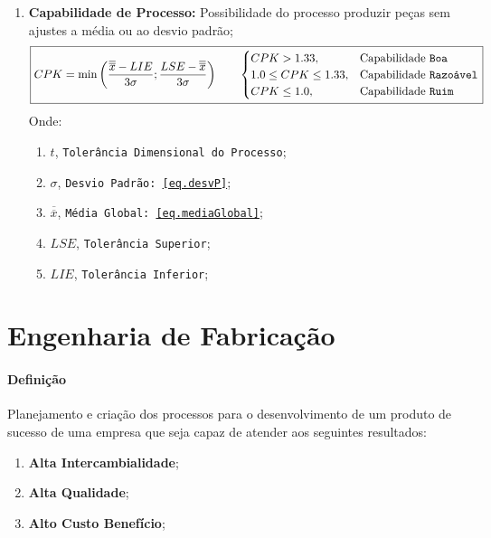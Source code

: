 \documentclass{article}
\begin{document}
\begin{enumerate}[rightmargin = \leftmargin, noitemsep]
                    \item \textbf{Capabilidade de Processo:} Possibilidade do processo produzir peças sem ajustes a média ou ao desvio padrão;
                        \begin{equation}
                            \boxed{
                                CPK = \min\left( \frac{\overline{\overline{x}} - LIE}{3\sigma}; \frac{LSE - \overline{\overline{x}}}{3\sigma} \right)
                                \qquad
                                \begin{cases}
                                    CPK > 1.33, & \text{Capabilidade \texttt{Boa}}\\
                                    1.0 \le CPK \le 1.33, & \text{Capabilidade \texttt{Razoável}}\\
                                    CPK \le 1.0, & \text{Capabilidade \texttt{Ruim}}\\
                                \end{cases}
                            }
                        \end{equation}
                    Onde:
                        \begin{enumerate}[rightmargin = \leftmargin, noitemsep]
                            \item $t$, \texttt{Tolerância Dimensional do Processo};
                            \item $\sigma$, \texttt{Desvio Padrão: \ref{eq.desvP}};
                            \item $\overline{\overline{x}}$, \texttt{Média Global: \ref{eq.mediaGlobal}};
                            \item $LSE$, \texttt{Tolerância Superior};
                            \item $LIE$, \texttt{Tolerância Inferior};
                        \end{enumerate}
                \end{enumerate}
\newpage

    \section{Engenharia de Fabricação}
        \paragraph{Definição}Planejamento e criação dos processos para o desenvolvimento de um produto de sucesso de uma empresa que seja capaz de atender aos seguintes resultados:
            \begin{enumerate}[noitemsep]
                \item \textbf{Alta Intercambialidade};
                \item \textbf{Alta Qualidade};
                \item \textbf{Alto Custo Benefício};
            \end{enumerate}
\end{document}
